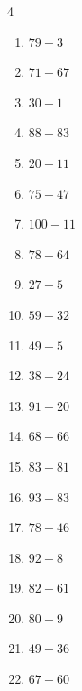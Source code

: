 \begin{multicols}{4}
\begin{enumerate}
  \item $79-3$
        \phantom{$=76$}

  \item $71-67$
        \phantom{$=4$}

  \item $30-1$
        \phantom{$=29$}

  \item $88-83$
        \phantom{$=5$}

  \item $20-11$
        \phantom{$=9$}

\columnbreak %

  \item $75-47$
        \phantom{$=28$}

  \item $100-11$
        \phantom{$=89$}

  \item $78-64$
        \phantom{$=14$}

  \item $27-5$
        \phantom{$=22$}

  \item $59-32$
        \phantom{$=27$}

  \item $49-5$
        \phantom{$=44$}

  \item $38-24$
        \phantom{$=14$}

  \item $91-20$
        \phantom{$=71$}

  \item $68-66$
        \phantom{$=2$}

  \item $83-81$
        \phantom{$=2$}

  \item $93-83$
        \phantom{$=10$}

  \item $78-46$
        \phantom{$=32$}

  \item $92-8$
        \phantom{$=84$}

  \item $82-61$
        \phantom{$=21$}

  \item $80-9$
        \phantom{$=71$}

  \item $49-36$
        \phantom{$=13$}

  \item $67-60$
        \phantom{$=7$}


\end{enumerate}
\end{multicols}
